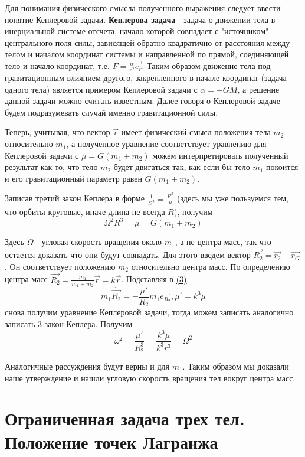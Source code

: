 \documentclass[a4paper]{article} %
\begin{document}
Для понимания физического смысла полученного выражения следует ввести понятие Кеплеровой задачи. \textbf{Кеплерова задача} - задача о движении тела в инерциальной системе отсчета, начало которой совпадает с "источником" центрального поля силы, зависящей обратно квадратично от расстояния между телом и началом координат системы и направленной по прямой, соединяющей тело и начало координат, т.е. $F = \frac{\alpha}{r^2}\vec{e_r}$. Таким образом движение тела под гравитационным влиянием другого, закрепленного в начале координат (задача одного тела) является примером Кеплеровой задачи с $\alpha = -GM$, а решение данной задачи можно считать известным. Далее говоря о Кеплеровой задаче будем подразумевать случай именно гравитационной силы.

Теперь, учитывая, что вектор $\vec{r}$ имеет физический смысл положения тела $m_2$ относительно $m_1$, а полученное уравнение соответствует уравнению для Кеплеровой задачи с $\mu = G(m_1 + m_2)$ можем интерпретировать полученный результат как то, что тело $m_2$ будет двигаться так, как если бы тело $m_1$ покоится и его гравитационный параметр равен $G(m_1 + m_2)$.

Записав третий закон Кеплера в форме $\frac{1}{\Omega^2} = \frac{R^3}{\mu}$ (здесь мы уже пользуемся тем, что орбиты круговые, иначе длина не всегда $R$), получим
\begin{equation}
\Omega^2 R^3 = \mu = G(m_1 + m_2)
\end{equation}

Здесь $\Omega$ - угловая скорость вращения около $m_1$, а не центра масс, так что остается доказать что они будут совпадать. Для этого введем вектор $\vec{R_2} = \vec{r_2} - \vec{r_G}$. Он соответствует положению $m_2$ относительно центра масс. По определению центра масс $\vec{R_2} = \frac{m_1}{m_1 + m_2}\vec{r} = k\vec{r}$. Подставляя в \hyperref[3]{(3)}
\begin{equation}
m_1\ddot{\vec{R_2}} = -\frac{\mu'}{R_2}m_1\vec{e_{R_2}}, \mu' = k^3\mu
\end{equation}
снова получим уравнение Кеплеровой задачи, тогда можем записать аналогично записать 3 закон Кеплера. Получим
\begin{equation}
\omega^2 = \frac{\mu'}{R_2^3} = \frac{k^3\mu}{k^3r^3} = \Omega^2
\end{equation}

Аналогичные рассуждения будут верны и для $m_1$. Таким образом мы доказали наше утверждение и нашли угловую скорость вращения тел вокруг центра масс.

\section{Ограниченная задача трех тел. Положение точек Лагранжа}
\end{document}
